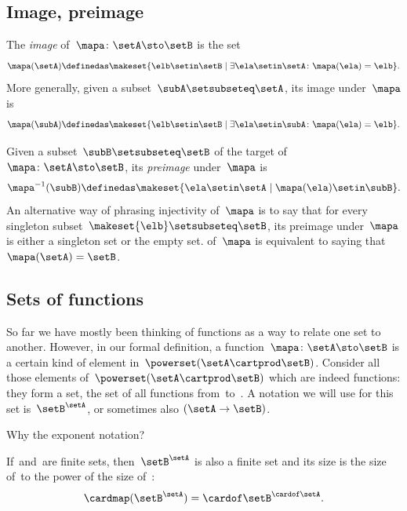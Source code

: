 \subsection{Image, preimage}

The \emph{image} of~$\mapa\colon \setA \sto \setB$ is the set
\begin{equation}
    \mapa(\setA) \definedas \makeset{ \elb \setin\setB \mid \exists \ela \setin\setA \colon \mapa(\ela) = \elb }.
\end{equation}
More generally, given a subset~$\subA \setsubseteq \setA$, its image under~$\mapa$ is
\begin{equation}
    \mapa(\subA) \definedas \makeset{ \elb \setin\setB \mid \exists \ela \setin\subA \colon \mapa(\ela) = \elb }.
\end{equation}

Given a subset~$\subB \setsubseteq \setB$ of the target of $\mapa\colon \setA \sto \setB$, its \emph{preimage} under~$\mapa$ is
\begin{equation}
    \mapa^{-1}(\subB) \definedas \makeset{ \ela \setin\setA \mid \mapa(\ela) \setin\subB }.
\end{equation}
An alternative way of phrasing injectivity of~$\mapa$ is to say that for every singleton subset~$\makeset{ \elb } \setsubseteq \setB$, its preimage under~$\mapa$ is either a singleton set or the empty set.
 of~$\mapa$ is equivalent to saying that~$\mapa(\setA) = \setB$.

\subsection{Sets of functions}

So far we have mostly been thinking of functions as a way to relate one set to another.
However, in our formal definition, a function~$\mapa \colon \setA \sto \setB$ is a certain kind of element in~$\powerset (\setA \cartprod \setB)$.
Consider all those elements of~$\powerset (\setA \cartprod \setB)$ which are indeed functions: they form a set, the set of all functions from~\setA to~\setB.
A notation we will use for this set is~$\setB^{\setA}$, or sometimes also $(\setA \to \setB)$.

Why the exponent notation?

If~\setA and~\setB are finite sets, then~$\setB^{\setA}$ is also a finite set and its size is the size of~\setB to the power of the size of~\setA:
\begin{equation}
    \cardmap(\setB^{\setA}) = {\cardof\setB} ^ {\cardof \setA}.
\end{equation}

    
    


